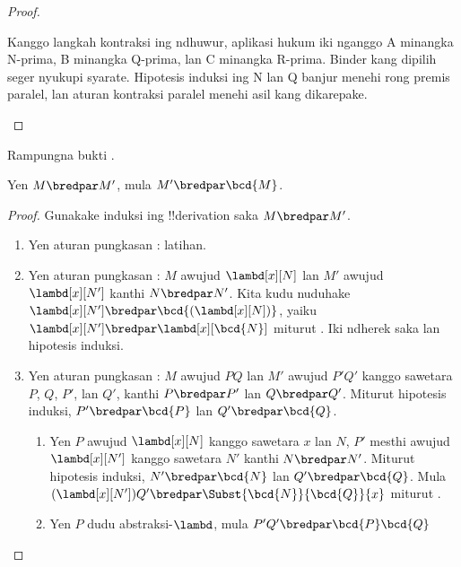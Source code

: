\documentclass[../../../include/open-logic-section]{subfiles}
\begin{document}
\begin{proof}
\begin{enumerate}
      Kanggo langkah kontraksi ing ndhuwur, aplikasi hukum iki nganggo A minangka N-prima, B minangka Q-prima, lan C minangka R-prima. Binder kang dipilih seger nyukupi syarate. Hipotesis induksi ing N lan Q banjur menehi rong premis paralel, lan aturan kontraksi paralel menehi asil kang dikarepake.
  \end{enumerate}
\end{proof}

\begin{prob}
  Rampungna bukti .
\end{prob}

\begin{lem}
  Yen $M \bredpar M'$, mula
  $M' \bredpar \bcd{M}$.
\end{lem}
\begin{proof}
  Gunakake induksi ing !!{derivation}
  saka $M \bredpar M'$.
  \begin{enumerate}
    \item Yen aturan pungkasan
      : latihan.
    \item Yen aturan pungkasan
      : $M$
      awujud $\lambd[x][N]$
      lan $M'$ awujud
      $\lambd[x][N']$ kanthi
      $N \bredpar N'$.
      Kita kudu nuduhake
      $\lambd[x][N'] \bredpar
      \bcd{(\lambd[x][N])}$,
      yaiku $\lambd[x][N'] \bredpar
      \lambd[x][\bcd{N}]$
      miturut .
      Iki ndherek saka
       lan
      hipotesis induksi.
    \item Yen aturan pungkasan
      :
      $M$ awujud $PQ$ lan
      $M'$ awujud $P'Q'$
      kanggo sawetara $P$,
      $Q$, $P'$, lan $Q'$,
      kanthi $P \bredpar P'$
      lan $Q \bredpar Q'$.
      Miturut hipotesis induksi,
      $P' \bredpar \bcd{P}$
      lan $Q' \bredpar \bcd{Q}$.
      \begin{enumerate}
        \item Yen $P$ awujud
          $\lambd[x][N]$ kanggo
          sawetara $x$ lan $N$,
          $P'$ mesthi awujud
          $\lambd[x][N']$
          kanggo sawetara $N'$
          kanthi $N \bredpar N'$.
          Miturut hipotesis induksi,
          $N' \bredpar \bcd{N}$
          lan $Q' \bredpar \bcd{Q}$.
          Mula $(\lambd[x][N'])Q' \bredpar
          \Subst{\bcd{N}}{\bcd{Q}}{x}$
          miturut .
        \item Yen $P$ dudu
          abstraksi-$\lambd$,
          mula $P'Q' \bredpar
          \bcd{P}\bcd{Q}$

\end{enumerate}
\end{enumerate}
\end{proof}
\end{document}
